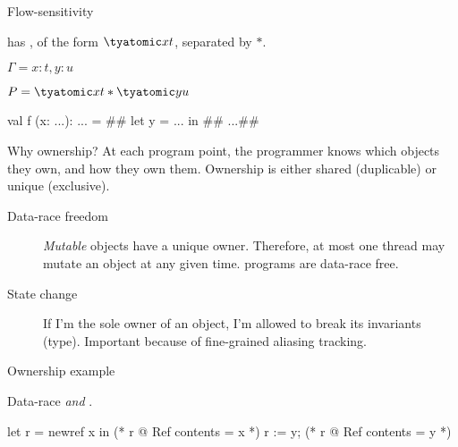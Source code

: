 \documentclass[final,xetex]{beamer}
\begin{document}
\begin{frame}[fragile]{Flow-sensitivity}

  \mezzo has , of the form $\tyatomic xt$, separated by
  $\ast$.

  \bigskip

  \begin{description}[\hspace{10em}]
    \item[In ML:] $\Gamma = x: t, y: u$
    \item[In \mezzo:] $P = \tyatomic xt \ast \tyatomic yu$
  \end{description}

  \bigskip

  \bigskip

  \MzStartBubbles
\begin{mzcode}
val f (x: ...): ... = #\MzProgramPoint#
  let y = ... in #\MzProgramPoint#
  ...#\MzProgramPoint#
\end{mzcode}

  \MzStartBubbles

  \bigskip

  \bigskip


\end{frame}

\begin{frame}[fragile]{Why ownership?}
  At each program point, the programmer knows which objects they own, and how
  they own them.
  Ownership is either shared (duplicable) or unique (exclusive).

  \vfill

  \begin{description}
    \item[Data-race freedom]
      \emph{Mutable} objects have a unique owner. Therefore, at most one thread
      may mutate an object at any given time. \mezzo programs are data-race
      free.
    \item[State change]
      If I'm the sole owner of an object, I'm allowed to break its invariants
      (type). Important because of fine-grained aliasing tracking.
  \end{description}
\end{frame}

\begin{frame}[fragile]{Ownership example}

  Data-race  \emph{and} .

  \bigskip

  \bigskip

  \begin{mzcode}
let r = newref x in
(* r @ Ref { contents = x } *)
r := y;
(* r @ Ref { contents = y } *)
  \end{mzcode}

\end{frame}
\end{document}
